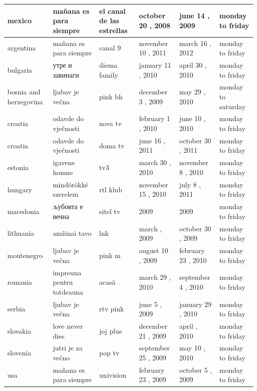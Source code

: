 \documentclass{article}
\begin{document}
\begin{tabular}{llllll}
\toprule
mexico & mañana es para siempre & el canal de las estrellas & october 20 , 2008 & june 14 , 2009 & monday to friday \\
\midrule
argentina & mañana es para siempre & canal 9 & november 10 , 2011 & march 16 , 2012 & monday to friday \\
bulgaria & утре и завинаги & diema family & january 11 , 2010 & april 30 , 2010 & monday to friday \\
bosnia and herzegovina & ljubav je večna & pink bh & december 3 , 2009 & may 29 , 2010 & monday to saturday \\
croatia & odavde do vječnosti & nova tv & february 1 , 2010 & june 10 , 2010 & monday to friday \\
croatia & odavde do vječnosti & doma tv & june 16 , 2011 & october 30 , 2011 & monday to friday \\
estonia & igavene homne & tv3 & march 30 , 2010 & november 8 , 2010 & monday to friday \\
hungary & mindörökké szerelem & rtl klub & november 15 , 2010 & july 8 , 2011 & monday to friday \\
macedonia & љубовта е вечна & sitel tv & 2009 & 2009 & monday to friday \\
lithuania & amžinai tavo & lnk & march , 2009 & october 30 , 2009 & monday to friday \\
montenegro & ljubav je večna & pink m & august 10 , 2009 & february 23 , 2010 & monday to friday \\
romania & impreuna pentru totdeauna & acasă & march 29 , 2010 & september 4 , 2010 & monday to friday \\
serbia & ljubav je večna & rtv pink & june 5 , 2009 & january 29 , 2010 & monday to friday \\
slovakia & love never dies & joj plus & december 21 , 2009 & april , 2010 & monday to friday \\
slovenia & jutri je za večno & pop tv & september 25 , 2009 & may 10 , 2010 & monday to friday \\
usa & mañana es para siempre & univision & february 23 , 2009 & october 5 , 2009 & monday to friday \\
\bottomrule
\end{tabular}
\end{document}
